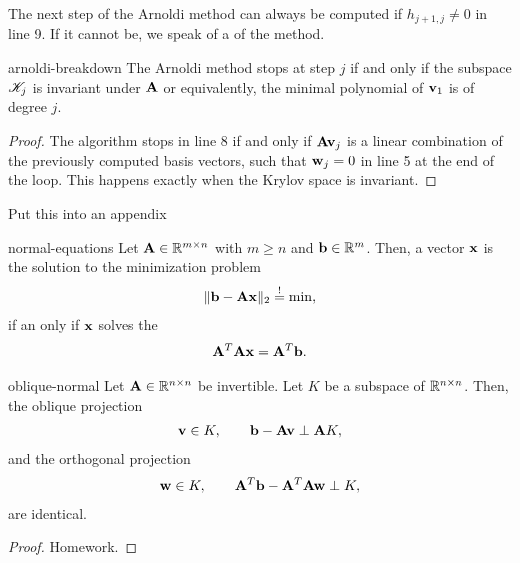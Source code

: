 \begin{remark}
  The next step of the Arnoldi method can always be computed if
  $h_{j+1,j}\neq 0$ in line 9. If it cannot be, we speak of a
   of the method.
\end{remark}

\begin{Lemma}{arnoldi-breakdown}
  The Arnoldi method stops at step $j$ if and only if the subspace $\mathscr K_j$ is invariant under $\mathbf A$ or equivalently, the minimal polynomial of $\mathbf v_1$ is of degree $j$.
\end{Lemma}

\begin{proof}
  The algorithm stops in line 8 if and only if $\mathbf A\mathbf v_j$ is a
  linear combination of the previously computed basis vectors, such
  that $\mathbf w_j=0$ in line 5 at the end of the loop. This happens
  exactly when the Krylov space is invariant.
\end{proof}

\begin{todo}
  Put this into an appendix
\end{todo}

\begin{Theorem}{normal-equations}
  Let $\mathbf A\in\mathbb R^{m\times n}$ with $m\ge n$ and $\mathbf b\in\mathbb R^m$. Then, a vector $\mathbf x$ is the solution to the minimization problem
  \begin{gather}
    \lVert\mathbf b-\mathbf A\mathbf x\rVert_2 \stackrel{!}{=} \min,
  \end{gather}
  if an only if $\mathbf x$ solves the 
  \begin{gather}
    \mathbf A^T\mathbf A\mathbf x = \mathbf A^T \mathbf b.
  \end{gather}
\end{Theorem}

\begin{Lemma}{oblique-normal}
  Let $\mathbf A\in\mathbb R^{n\times n}$ be invertible. Let $K$ be a subspace of $\mathbb R^{n\times n}$. Then, the oblique projection
  \begin{gather}
    \mathbf v\in K, \qquad \mathbf b-\mathbf A\mathbf v \perp \mathbf A K,
  \end{gather}
  and the orthogonal projection
  \begin{gather}
    \mathbf w\in K, \qquad \mathbf A^T \mathbf b-\mathbf A^T\mathbf A\mathbf w \perp K,
  \end{gather}
  are identical.
\end{Lemma}

\begin{proof}
  Homework.
\end{proof}

